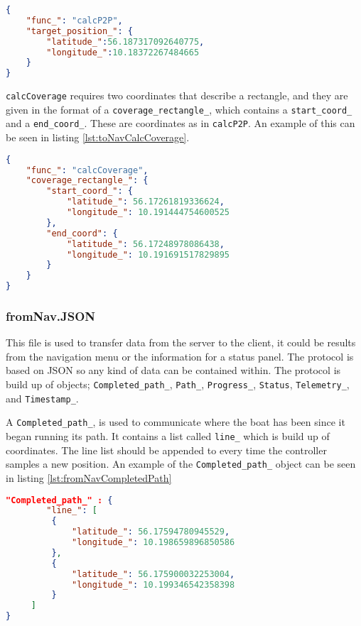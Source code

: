\begin{lstlisting}[caption = {Example of a calcP2P call in the toNav.JSON}, captionpos=b, label={lst:toNavCalcP2P}, language=json,firstnumber=1]
{
	"func_": "calcP2P",
	"target_position_": {
		"latitude_":56.187317092640775,
		"longitude_":10.18372267484665
	}
}
\end{lstlisting}

\texttt{calcCoverage} requires two coordinates that describe a rectangle, and they are given in the format of a \texttt{coverage_rectangle_}, which contains a \texttt{start_coord_} and a \texttt{end_coord_}. These are coordinates as in \texttt{calcP2P}. An example of this can be seen in listing \ref{lst:toNavCalcCoverage}.

\begin{lstlisting}[caption = {Example of a calcCoverage call in the toNav.JSON}, captionpos=b, label={lst:toNavCalcCoverage}, language=json,firstnumber=1]
{
	"func_": "calcCoverage",
	"coverage_rectangle_": {
		"start_coord_": {
			"latitude_": 56.17261819336624,
			"longitude_": 10.191444754600525
		},
		"end_coord": {
			"latitude_": 56.17248978086438,
			"longitude_": 10.191691517829895
		}
	}
}
\end{lstlisting}

\subsubsection{fromNav.JSON}
This file is used to transfer data from the server to the client, it could be results from the navigation menu or the information for a status panel. 
The protocol is based on JSON so any kind of data can be contained within. The protocol is build up of objects;  \texttt{Completed_path_}, \texttt{Path_}, \texttt{Progress_}, \texttt{Status}, \texttt{Telemetry_}, and \texttt{Timestamp_}.

A \texttt{Completed_path_}, is used to communicate where the boat has been since it began running its path. It contains a list called \texttt{line_} which is build up of coordinates.
The line list should be appended to every time the controller samples a new position. An example of the \texttt{Completed_path_} object can be seen in listing \ref{lst:fromNavCompletedPath}

\begin{lstlisting}[caption = {Example of a Completed_path_ object in fromNav.JSON}, captionpos=b, label={lst:fromNavCompletedPath}, language=json,firstnumber=1]
"Completed_path_" : {
		"line_": [
         {
             "latitude_": 56.17594780945529,
             "longitude_": 10.198659896850586
         },
         {
             "latitude_": 56.175900032253004,
             "longitude_": 10.199346542358398
         }
     ]
}
\end{lstlisting}

